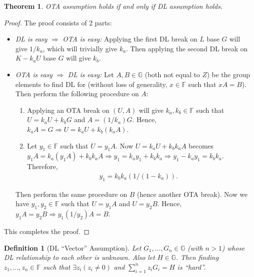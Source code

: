 \documentclass{article}
\newtheorem{definition}{Definition}[section]
\newtheorem{theorem}{Theorem}[section]
\begin{document}
\begin{theorem}
OTA assumption holds if and only if DL assumption holds.
\end{theorem}
\begin{proof}
The proof consists of 2 parts:
\begin{itemize}
    \item \textit{DL is easy $\Rightarrow$ OTA is easy:} Applying the first DL break on $L$ base $G$ will give $1/k_a$, which will trivially give $k_a$. Then applying the second DL break on $K - k_a U$ base $G$ will give $k_b$.
    \item \textit{OTA is easy $\Rightarrow$ DL is easy:} Let $A, B\in\mathbb{G}$ (both not equal to $Z$) be the group elements to find DL for (without loss of generality, $x\in\mathbb{F}$ such that $xA=B$). Then perform the following procedure on $A$:
        \begin{enumerate}
        \item Applying an OTA break on $(U, A)$ will give $k_a, k_b\in\mathbb{F}$ such that $U = k_a U + k_b G$ and $A = (1/k_a)G$. Hence, $k_a A = G \Rightarrow U = k_a U + k_b (k_a A)$.
        \item Let $y_1\in\mathbb{F}$ such that $U=y_1 A$. Now $U = k_a U + k_b k_a A$ becomes $y_1 A = k_a (y_1 A) + k_b k_a A \Rightarrow y_1 = k_a y_1 + k_b k_a \Rightarrow y_1 - k_a y_1 = k_b k_a$. Therefore,
        \begin{align*}
            y_1 = k_b k_a (1/(1 - k_a)).
        \end{align*}
        \end{enumerate}
Then perform the same procedure on $B$ (hence another OTA break). Now we have $y_1, y_2\in\mathbb{F}$ such that $U=y_1 A$ and $U=y_2 B$. Hence, $y_1 A = y_2 B \Rightarrow  y_1(1/y_2) A = B$.
\end{itemize}
This completes the proof.
\end{proof}

\begin{definition}[DL ``Vector'' Assumption]
Let $G_1,\ldots,G_n\in\mathbb{G}$ (with $n>1$) whose DL relationship to each other is unknown. Also let $H\in\mathbb{G}$. Then finding $z_1,\ldots,z_n\in\mathbb{F}$ such that $\exists z_i(z_i \neq 0)$ and $\sum_{i=1}^{n}{z_i G_i}=H$ is ``hard''.
\end{definition}
\end{document}
